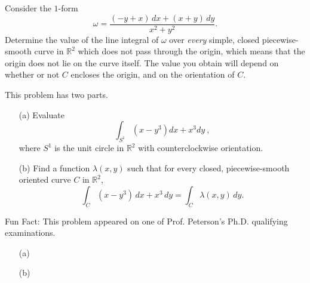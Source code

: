 \documentclass[11pt,letterpaper,cm]{nupset}
\begin{document}
\begin{problem}[Exercise 9] Consider the $1$-form
	$$\omega = \frac{(-y+x)\,dx+(x+y)\,dy}{x^2+y^2}.$$
	Determine the value of the line integral of $\omega$ over \textit{every} simple, closed piecewise-smooth curve in $\mathbb{R}^2$ which does not pass through the origin, which means that the origin does not lie on the curve itself. The value you obtain will depend on whether or not $C$ encloses the origin, and on the orientation of $C$.
\end{problem}
\begin{solution}
\end{solution}
\newpage

\begin{problem}[Exercise 10] This problem has two parts.
	\begin{itemize}
		\item[(a)] Evaluate $$\int_{S^1} (x-y^3)dx + x^3dy\ ,$$ where $S^1$ is the unit circle in $\mathbb{R}^2$ with counterclockwise orientation.
		\item[(b)] Find a function $\lambda(x,y)$ such that for every closed, piecewise-smooth oriented curve $C$ in $\mathbb{R}^2$,
		$$\int_C (x-y^3)\,dx + x^3\,dy = \int_C \lambda(x,y)\,dy.$$
	\end{itemize}
	Fun Fact: This problem appeared on one of Prof. Peterson's Ph.D. qualifying examinations.
\end{problem}
\begin{solution}
		\begin{itemize}
		\item[(a)] 
		\item[(b)] 
	\end{itemize}
\end{solution}
\end{document}
